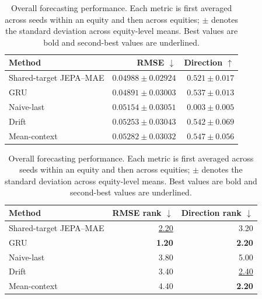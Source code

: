 \begin{table}[t]
\centering
\small
\caption{Overall forecasting performance. Each metric is first averaged across seeds within an equity and then across equities; $\pm$ denotes the standard deviation across equity-level means. Best values are bold and second-best values are underlined.}
\label{tab:main_metrics}
\begin{tabular}{lrr}
\toprule
Method & RMSE $\downarrow$ & Direction $\uparrow$ \\
\midrule
Shared-target JEPA--MAE & \underline{$0.04988 \pm 0.02924$} & $0.521 \pm 0.017$ \\
GRU & \textbf{$0.04891 \pm 0.03003$} & $0.537 \pm 0.013$ \\
Naive-last & $0.05154 \pm 0.03051$ & $0.003 \pm 0.005$ \\
Drift & $0.05253 \pm 0.03043$ & \underline{$0.542 \pm 0.069$} \\
Mean-context & $0.05282 \pm 0.03032$ & \textbf{$0.547 \pm 0.056$} \\
\bottomrule
\end{tabular}
\par\medskip
\begin{tabular}{lrr}
\toprule
Method & RMSE rank $\downarrow$ & Direction rank $\downarrow$ \\
\midrule
Shared-target JEPA--MAE & \underline{2.20} & 3.20 \\
GRU & \textbf{1.20} & \textbf{2.20} \\
Naive-last & 3.80 & 5.00 \\
Drift & 3.40 & \underline{2.40} \\
Mean-context & 4.40 & \textbf{2.20} \\
\bottomrule
\end{tabular}
\end{table}
